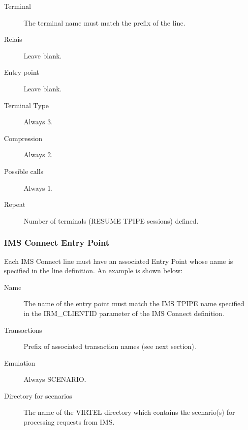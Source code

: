 \documentclass[letterpaper,10pt,english]{sphinxmanual}
\begin{document}
\begin{description}
\item[{Terminal}] \leavevmode
The terminal name must match the prefix of the line.

\item[{Relais}] \leavevmode
Leave blank.

\item[{Entry point}] \leavevmode
Leave blank.

\item[{Terminal Type}] \leavevmode
Always 3.

\item[{Compression}] \leavevmode
Always 2.

\item[{Possible calls}] \leavevmode
Always 1.

\item[{Repeat}] \leavevmode
Number of terminals (RESUME TPIPE sessions) defined.

\end{description}


\subsubsection{IMS Connect Entry Point}
\label{\detokenize{connectivity_guide:ims-connect-entry-point}}
Each IMS Connect line must have an associated Entry Point whose name is specified in the line definition. An example is shown below:

\begin{description}
\item[{Name}] \leavevmode
The name of the entry point must match the IMS TPIPE name specified
in the IRM\_CLIENTID parameter of the IMS Connect definition.

\item[{Transactions}] \leavevmode
Prefix of associated transaction names (see next section).

\item[{Emulation}] \leavevmode
Always SCENARIO.

\item[{Directory for scenarios}] \leavevmode
The name of the VIRTEL directory which contains the scenario(s) for
processing requests from IMS.

\end{description}
\end{document}
